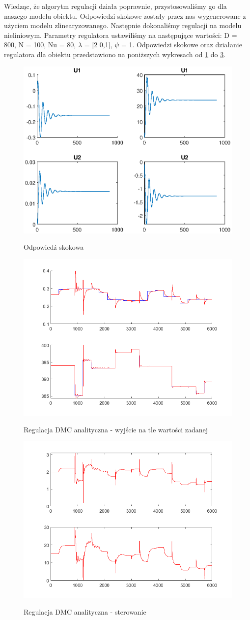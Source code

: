 \newpage
Wiedząc, że algorytm regulacji działa poprawnie, przystosowaliśmy go dla naszego modelu obiektu. Odpowiedzi skokowe zostały przez nas wygenerowane z użyciem modelu zlinearyzowanego. Następnie dokonaliśmy regulacji na modelu nieliniowym. Parametry regulatora ustawiliśmy na następujące wartości: D = 800, N = 100, Nu = 80, $\lambda$ = [2 0,1], $\psi$ = 1. Odpowiedzi skokowe oraz działanie regulatora dla obiektu przedstawiono na poniższych wykresach od \ref{ch2:skok} do \ref{ch2:dmcanaster}.

\begin{figure}[h!]
	\centering
	\includegraphics[width=.7\linewidth]{img/skok.eps}
	\label{ch2:skok}
	\caption{Odpowiedź skokowa}
\end{figure}
\begin{figure}[h!]
	\centering
	\includegraphics[width=.7\linewidth]{img/yDMC.png}
	\label{ch2:dmcana}
	\caption{Regulacja DMC analityczna - wyjście na tle wartości zadanej}
\end{figure}
\begin{figure}[h!]
	\centering
	\includegraphics[width=.7\linewidth]{img/uDMC.png}
	\label{ch2:dmcanaster}
	\caption{Regulacja DMC analityczna - sterowanie}
\end{figure}

